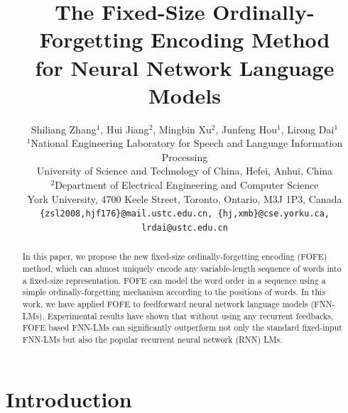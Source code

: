 \documentclass[11pt]{article}
\title{The Fixed-Size Ordinally-Forgetting Encoding Method \\ for Neural Network Language Models}
\author{Shiliang Zhang$^1$, Hui Jiang$^2$, Mingbin Xu$^2$, Junfeng Hou$^1$, Lirong Dai$^1$ \\
  $^1$National Engineering Laboratory for Speech and Language Information Processing \\
  University of Science and Technology of China, Hefei, Anhui,  China\\
  $^2$Department of Electrical Engineering and Computer Science \\
  York University,  4700 Keele Street, Toronto, Ontario, M3J 1P3, Canada\\
  {\tt \small \{zsl2008,hjf176\}@mail.ustc.edu.cn, \{hj,xmb\}@cse.yorku.ca, lrdai@ustc.edu.cn}
}
\date{}
\begin{document}
\maketitle
\begin{abstract}
In this paper, we propose the new fixed-size ordinally-forgetting encoding (FOFE) method, which can almost uniquely encode any variable-length sequence of words into a fixed-size representation. FOFE can model the word order in a sequence using a simple ordinally-forgetting mechanism according to the positions of words. In this work, we have applied FOFE to feedforward neural network language models (FNN-LMs). Experimental results have shown that without using any recurrent feedbacks, FOFE based FNN-LMs can significantly outperform not only the standard fixed-input FNN-LMs but also the popular recurrent neural network (RNN) LMs.
\end{abstract}

\section{Introduction}
\end{document}
